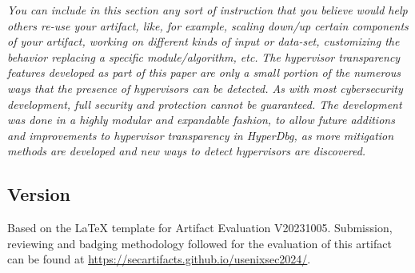 \textit{You can include in this section any sort of instruction that you believe
would help others re-use your artifact, like, for example, scaling down/up
certain components of your artifact, working on different kinds of input or
data-set, customizing the behavior replacing a specific module/algorithm, etc.}
\textit{The hypervisor transparency features developed as part of this paper are only a small portion
of the numerous ways that the presence of hypervisors can be detected. As with most cybersecurity development, 
full security and protection cannot be guaranteed. The development was done in a highly modular and expandable fashion, 
to allow future additions and improvements to hypervisor transparency in HyperDbg, as more mitigation methods are developed and new ways to detect hypervisors are discovered. }


\subsection{Version}
Based on the LaTeX template for Artifact Evaluation V20231005. Submission,
reviewing and badging methodology followed for the evaluation of this artifact
can be found at \url{https://secartifacts.github.io/usenixsec2024/}.